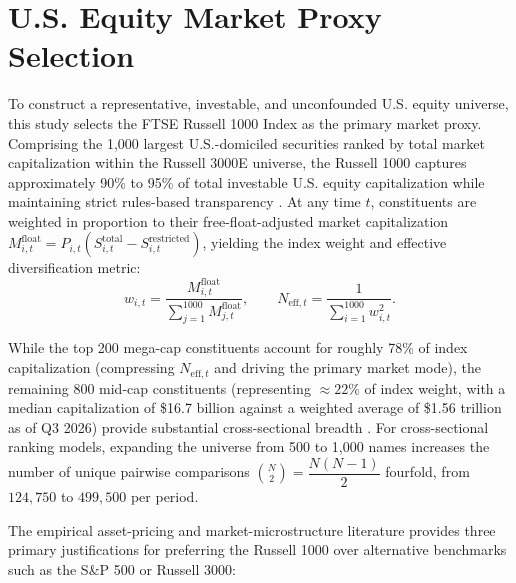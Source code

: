 \section{U.S. Equity Market Proxy Selection} \label{sec:market-selection}
To construct a representative, investable, and unconfounded U.S. equity universe, this study selects the FTSE Russell 1000 Index as the primary market proxy. Comprising the 1,000 largest U.S.-domiciled securities ranked by total market capitalization within the Russell 3000E universe, the Russell 1000 captures approximately 90\% to 95\% of total investable U.S. equity capitalization while maintaining strict rules-based transparency \cite{ftserussell2026}. At any time $t$, constituents are weighted in proportion to their free-float-adjusted market capitalization $M_{i,t}^{\mathrm{float}} = P_{i,t}(S_{i,t}^{\mathrm{total}} - S_{i,t}^{\mathrm{restricted}})$, yielding the index weight and effective diversification metric:
\begin{equation}
	w_{i,t} = \dfrac{M_{i,t}^{\mathrm{float}}}{\displaystyle\sum_{j=1}^{1000} M_{j,t}^{\mathrm{float}}},
	\qquad
	N_{\mathrm{eff},t} = \dfrac{1}{\displaystyle\sum_{i=1}^{1000} w_{i,t}^2}.
	\label{eq:weights_neff}
\end{equation}

While the top 200 mega-cap constituents account for roughly 78\% of index capitalization (compressing $N_{\mathrm{eff},t}$ and driving the primary market mode), the remaining 800 mid-cap constituents (representing $\approx 22\%$ of index weight, with a median capitalization of \$16.7 billion against a weighted average of \$1.56 trillion as of Q3 2026) provide substantial cross-sectional breadth \cite{ftserussell2026}. For cross-sectional ranking models, expanding the universe from 500 to 1,000 names increases the number of unique pairwise comparisons $\displaystyle\binom{N}{2} = \dfrac{N(N-1)}{2}$ fourfold, from $124{,}750$ to $499{,}500$ per period.

\medskip

The empirical asset-pricing and market-microstructure literature provides three primary justifications for preferring the Russell 1000 over alternative benchmarks such as the S\&P 500 or Russell 3000:

